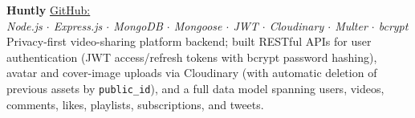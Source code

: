 \item \textbf{Huntly}
\href{https://github.com/Ank0it/Huntly}{GitHub: \faGithub} \\
\textit{Node.js $\cdot$ Express.js $\cdot$ MongoDB $\cdot$ Mongoose $\cdot$ JWT $\cdot$ Cloudinary $\cdot$ Multer $\cdot$ bcrypt} \\
Privacy-first video-sharing platform backend; built RESTful APIs for user authentication (JWT access/refresh tokens with bcrypt password hashing), avatar and cover-image uploads via Cloudinary (with automatic deletion of previous assets by \texttt{public\_id}), and a full data model spanning users, videos, comments, likes, playlists, subscriptions, and tweets.
